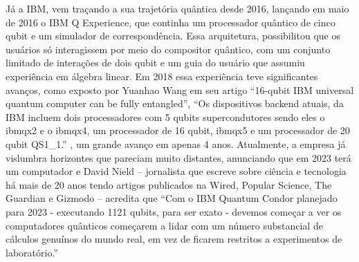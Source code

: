 Já a IBM, vem traçando a sua trajetória quântica desde 2016, lançando em maio de 2016 o IBM Q Experience, que continha um processador quântico de cinco qubit e um simulador de correspondência. Essa arquitetura, possibilitou que os usuários só interagissem por meio do compositor quântico, com um conjunto limitado de interações de dois qubit e um guia do usuário que assumiu experiência em álgebra linear. Em 2018 essa experiência teve significantes avanços, como exposto por Yuanhao Wang em seu artigo ``16-qubit IBM universal quantum computer can be fully entangled'', ``Os dispositivos backend atuais, da IBM incluem dois processadores com 5 qubits supercondutores sendo eles o ibmqx2 e o ibmqx4, um processador de 16 qubit, ibmqx5 e um processador de 20 qubit QS1\_1.'' \cite{18}, um grande avanço em apenas 4 anos. Atualmente, a empresa já vislumbra horizontes que pareciam muito distantes, anunciando que em 2023 terá um computador e David Nield – jornalista que escreve sobre ciência e tecnologia há mais de 20 anos tendo artigos publicados na Wired, Popular Science, The Guardian e Gizmodo – acredita que ``Com o IBM Quantum Condor planejado para 2023 - executando 1121 qubits, para ser exato - devemos começar a ver os computadores quânticos começarem a lidar com um número substancial de cálculos genuínos do mundo real, em vez de ficarem restritos a experimentos de laboratório.'' \cite{19}

